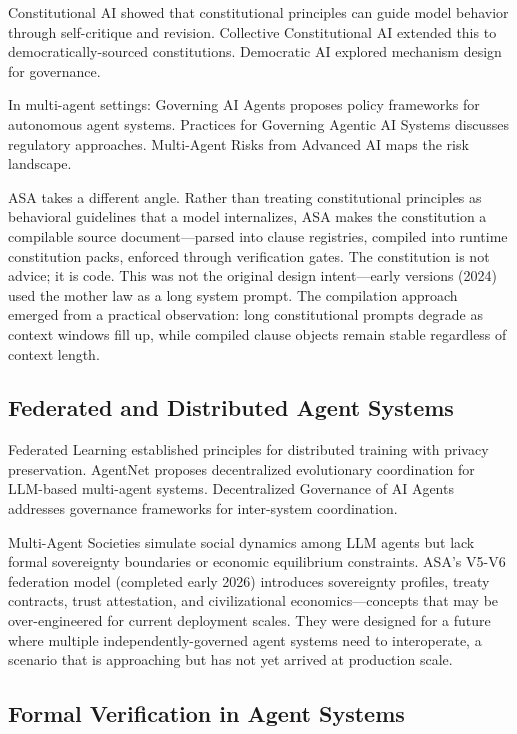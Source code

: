 \documentclass[12pt,a4paper]{article}
\begin{document}
Constitutional AI \cite{ref1} showed that constitutional principles can guide model behavior through self-critique and revision. Collective Constitutional AI \cite{ref18} extended this to democratically-sourced constitutions. Democratic AI \cite{ref6} explored mechanism design for governance.

In multi-agent settings: Governing AI Agents \cite{ref2} proposes policy frameworks for autonomous agent systems. Practices for Governing Agentic AI Systems \cite{ref12} discusses regulatory approaches. Multi-Agent Risks from Advanced AI \cite{ref4} maps the risk landscape.

ASA takes a different angle. Rather than treating constitutional principles as behavioral guidelines that a model internalizes, ASA makes the constitution a compilable source document---parsed into clause registries, compiled into runtime constitution packs, enforced through verification gates. The constitution is not advice; it is code. This was not the original design intent---early versions (2024) used the mother law as a long system prompt. The compilation approach emerged from a practical observation: long constitutional prompts degrade as context windows fill up, while compiled clause objects remain stable regardless of context length.

\subsection{Federated and Distributed Agent Systems}


Federated Learning \cite{ref8} established principles for distributed training with privacy preservation. AgentNet \cite{ref15} proposes decentralized evolutionary coordination for LLM-based multi-agent systems. Decentralized Governance of AI Agents \cite{ref7} addresses governance frameworks for inter-system coordination.

Multi-Agent Societies \cite{ref11,ref3} simulate social dynamics among LLM agents but lack formal sovereignty boundaries or economic equilibrium constraints. ASA's V5-V6 federation model (completed early 2026) introduces sovereignty profiles, treaty contracts, trust attestation, and civilizational economics---concepts that may be over-engineered for current deployment scales. They were designed for a future where multiple independently-governed agent systems need to interoperate, a scenario that is approaching but has not yet arrived at production scale.

\subsection{Formal Verification in Agent Systems}
\end{document}
